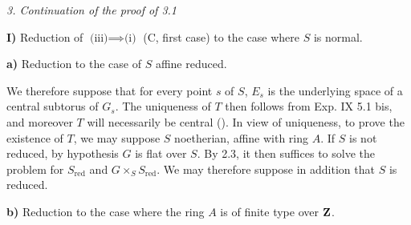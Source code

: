 \par\medskip\noindent\textit{3. Continuation of the proof of 3.1}\par
\noindent\textbf{I)} Reduction of $\text{(iii)}\implies\text{(i)}$ (C, first case) to the case where $S$ is normal.

\noindent\textbf{a)} Reduction to the case of $S$ affine reduced.

We therefore suppose that for every point $s$ of $S$, $E_s$ is the underlying space of a central subtorus of $G_s$. The uniqueness of $T$ then follows from Exp. IX 5.1 bis, and moreover $T$ will necessarily be central (\loccit). In view of uniqueness, to prove the existence of $T$, we may suppose $S$ noetherian, affine with ring $A$. If $S$ is not reduced, by hypothesis $G$ is flat over $S$. By 2.3, it then suffices to solve the problem for $S_{\mathrm{red}}$ and $G\times_S S_{\mathrm{red}}$. We may therefore suppose in addition that $S$ is reduced.

\noindent\textbf{b)} Reduction to the case where the ring $A$ is of finite type over $\mathbf{Z}$.

